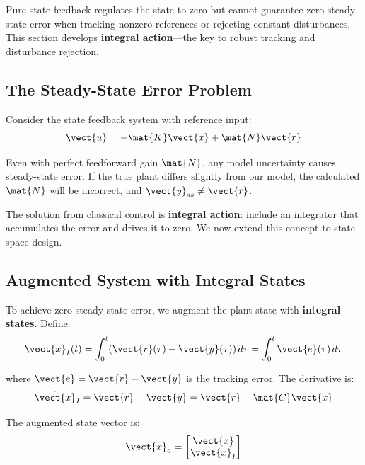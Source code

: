 Pure state feedback regulates the state to zero but cannot guarantee zero steady-state error when tracking nonzero references or rejecting constant disturbances. This section develops \textbf{integral action}---the key to robust tracking and disturbance rejection.

\subsection{The Steady-State Error Problem}

Consider the state feedback system with reference input:
\begin{equation}
\vect{u} = -\mat{K}\vect{x} + \mat{N}\vect{r}
\end{equation}

Even with perfect feedforward gain $\mat{N}$, any model uncertainty causes steady-state error. If the true plant differs slightly from our model, the calculated $\mat{N}$ will be incorrect, and $\vect{y}_{ss} \neq \vect{r}$.

The solution from classical control is \textbf{integral action}: include an integrator that accumulates the error and drives it to zero. We now extend this concept to state-space design.

\subsection{Augmented System with Integral States}

To achieve zero steady-state error, we augment the plant state with \textbf{integral states}. Define:
\begin{equation}
\vect{x}_I(t) = \int_0^t (\vect{r}(\tau) - \vect{y}(\tau)) \, d\tau = \int_0^t \vect{e}(\tau) \, d\tau
\label{eq:integral_state}
\end{equation}

where $\vect{e} = \vect{r} - \vect{y}$ is the tracking error. The derivative is:
\begin{equation}
\dot{\vect{x}}_I = \vect{r} - \vect{y} = \vect{r} - \mat{C}\vect{x}
\end{equation}

The augmented state vector is:
\begin{equation}
\vect{x}_a = \begin{bmatrix} \vect{x} \\ \vect{x}_I \end{bmatrix}
\end{equation}

